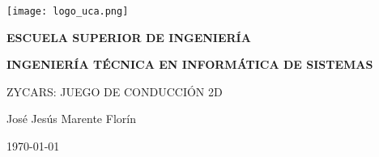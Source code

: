 

\begin{titlepage}

  \begin{center}

    \texttt{[image: logo\_uca.png]} \\
    
    \vspace{2.0cm}
    
    \LARGE{\textbf{ESCUELA SUPERIOR DE INGENIERÍA}} \\
    
    \vspace{1.0cm}
    
    \Large{\textbf{INGENIERÍA TÉCNICA EN INFORMÁTICA DE SISTEMAS}} \\
    
    \vspace{3.0cm}
    
    \Large{ZYCARS: JUEGO DE CONDUCCIÓN 2D} \\
    
    \vspace{2.0cm}
    
    \Large{José Jesús Marente Florín} \\
  
    \vspace{0.5cm}

    \large{\today}
    
  \end{center}
\end{titlepage}
